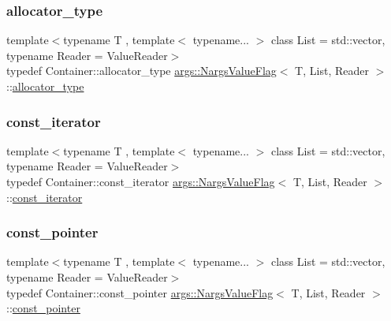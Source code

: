\subsubsection{\texorpdfstring{allocator\+\_\+type}{allocator\_type}}
{\footnotesize\ttfamily template$<$typename T , template$<$ typename... $>$ class List = std\+::vector, typename Reader  = Value\+Reader$>$ \\
typedef Container\+::allocator\+\_\+type \hyperlink{classargs_1_1_nargs_value_flag}{args\+::\+Nargs\+Value\+Flag}$<$ T, List, Reader $>$\+::\hyperlink{classargs_1_1_nargs_value_flag_a9c828e4bc64b0037e7e50bb98595a47f}{allocator\+\_\+type}}

\mbox{\label{classargs_1_1_nargs_value_flag_a115760faf263d007148b30c99d8e6bdc}} 
\subsubsection{\texorpdfstring{const\+\_\+iterator}{const\_iterator}}
{\footnotesize\ttfamily template$<$typename T , template$<$ typename... $>$ class List = std\+::vector, typename Reader  = Value\+Reader$>$ \\
typedef Container\+::const\+\_\+iterator \hyperlink{classargs_1_1_nargs_value_flag}{args\+::\+Nargs\+Value\+Flag}$<$ T, List, Reader $>$\+::\hyperlink{classargs_1_1_nargs_value_flag_a115760faf263d007148b30c99d8e6bdc}{const\+\_\+iterator}}

\mbox{\label{classargs_1_1_nargs_value_flag_a7e7d4871821e63a9db65652fa5dda864}} 
\subsubsection{\texorpdfstring{const\+\_\+pointer}{const\_pointer}}
{\footnotesize\ttfamily template$<$typename T , template$<$ typename... $>$ class List = std\+::vector, typename Reader  = Value\+Reader$>$ \\
typedef Container\+::const\+\_\+pointer \hyperlink{classargs_1_1_nargs_value_flag}{args\+::\+Nargs\+Value\+Flag}$<$ T, List, Reader $>$\+::\hyperlink{classargs_1_1_nargs_value_flag_a7e7d4871821e63a9db65652fa5dda864}{const\+\_\+pointer}}

